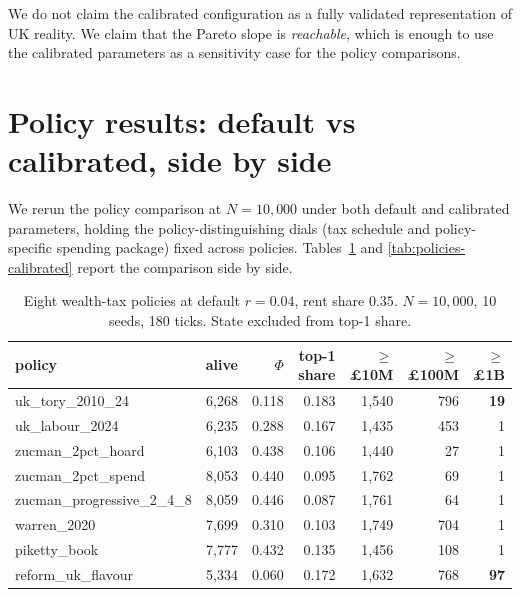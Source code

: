 \documentclass[11pt]{article}
\begin{document}
We do not claim the calibrated configuration as a fully validated
representation of UK reality.  We claim that the Pareto slope is
\emph{reachable}, which is enough to use the calibrated parameters
as a sensitivity case for the policy comparisons.

\section{Policy results: default vs calibrated, side by side}
\label{sec:policies}

We rerun the policy comparison at $N = 10{,}000$ under both default
and calibrated parameters, holding the policy-distinguishing dials
(tax schedule and policy-specific spending package) fixed across
policies.  Tables~\ref{tab:policies-default} and
\ref{tab:policies-calibrated} report the comparison side by side.

\begin{table}[t]
\centering
\small
\caption{Eight wealth-tax policies at default $r = 0.04$,
rent share $0.35$.  $N = 10{,}000$, 10 seeds, 180 ticks.  State
excluded from top-1 share.}
\label{tab:policies-default}
\begin{tabular}{lrrrrrr}
\toprule
policy & alive & $\Phi$ & top-1 share & $\geq$\pounds10M & $\geq$\pounds100M & $\geq$\pounds1B \\
\midrule
uk\_tory\_2010\_24            & 6{,}268 & 0.118 & 0.183 & 1{,}540 & 796 & \textbf{19} \\
uk\_labour\_2024              & 6{,}235 & 0.288 & 0.167 & 1{,}435 & 453 & 1 \\
zucman\_2pct\_hoard           & 6{,}103 & 0.438 & 0.106 & 1{,}440 & 27  & 1 \\
zucman\_2pct\_spend           & 8{,}053 & 0.440 & 0.095 & 1{,}762 & 69  & 1 \\
zucman\_progressive\_2\_4\_8 & 8{,}059 & 0.446 & 0.087 & 1{,}761 & 64  & 1 \\
warren\_2020                  & 7{,}699 & 0.310 & 0.103 & 1{,}749 & 704 & 1 \\
piketty\_book                 & 7{,}777 & 0.432 & 0.135 & 1{,}456 & 108 & 1 \\
reform\_uk\_flavour           & 5{,}334 & 0.060 & 0.172 & 1{,}632 & 768 & \textbf{97} \\
\bottomrule
\end{tabular}
\end{table}
\end{document}
